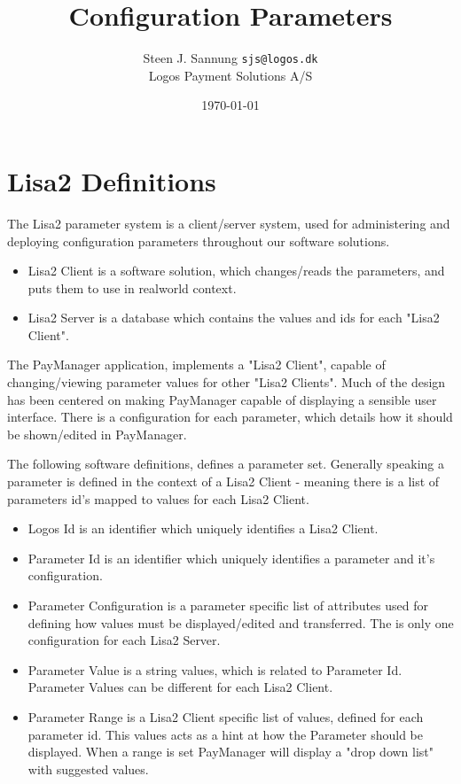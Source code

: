 \documentclass[a4paper,12pt]{article}
\begin{document}
\title{Configuration Parameters}
\author{Steen J. Sannung \texttt{sjs@logos.dk} \\
Logos Payment Solutions A/S }
\date{\today}

\maketitle

\section{}

\section{Lisa2 Definitions}

The Lisa2 parameter system is a client/server system, used for administering and deploying configuration parameters throughout our software solutions.
\begin{itemize}
\item Lisa2 Client is a software solution, which changes/reads the parameters, and puts them to use in realworld context. 
\item Lisa2 Server is a database which contains the values and ids for each "Lisa2 Client".
\end{itemize}

The PayManager application, implements a "Lisa2 Client", capable of changing/viewing parameter values for other "Lisa2 Clients". Much of
the design has been centered on making PayManager capable of displaying a sensible user interface. 
There is a configuration for each parameter, which details how it should be shown/edited in PayManager.

The following software definitions, defines a parameter set. Generally speaking a parameter is defined in the context of a Lisa2 Client - 
meaning there is a list of parameters id's mapped to values for each Lisa2 Client.

\begin{itemize}
\item Logos Id is an identifier which uniquely identifies a Lisa2 Client. 
\item Parameter Id is an identifier which uniquely identifies a parameter and it's configuration.
\item Parameter Configuration is a parameter specific list of attributes used for defining how values must be displayed/edited and transferred. The is only one configuration for each Lisa2 Server.
\item Parameter Value is a string values, which is related to Parameter Id. Parameter Values can be different for each Lisa2 Client.
\item Parameter Range is a Lisa2 Client specific list of values, defined for each parameter id. This values acts as a hint at how the Parameter should be displayed. 
When a range is set PayManager will display a "drop down list" with suggested values.
\end{itemize}
\end{document}
